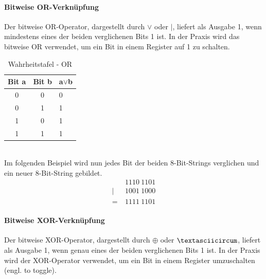 \documentclass[12pt,a4paper]{scrartcl}
\numberwithin{equation}{section}
\numberwithin{myalgctr}{section}
\numberwithin{mytheoremctr}{section}
\newcommand*\BitOr{\mathrel{|}}
\newcommand{\mpar}[1]{\paragraph*{#1}\mbox{}\par}
\begin{document}
	\mpar{Bitweise OR-Verknüpfung}\noindent
	Der bitweise OR-Operator, dargestellt durch $\vee$ oder $\BitOr$, liefert als Ausgabe 1, wenn mindestens eines der beiden verglichenen Bits 1 ist. In der Praxis wird das bitweise OR verwendet, um ein Bit in einem Register auf 1 zu schalten.\\
	\begin{table}[h!]
		\centering
		\begin{tabular}{|c|c|l|}
			\hline
			\rowcolor[HTML]{C0C0C0} 
			{\color[HTML]{000000} Bit a} & {\color[HTML]{000000} Bit b} & {\color[HTML]{000000} a$\vee$b} \\ \hline
			\rowcolor[HTML]{EFEFEF} 
			0                            & 0                            & 0                             \\ \hline
			\rowcolor[HTML]{EFEFEF} 
			0                            & 1                            & 1                             \\ \hline
			\rowcolor[HTML]{EFEFEF} 
			1                            & 0                            & 1                             \\ \hline
			\rowcolor[HTML]{EFEFEF} 
			1                            & 1                            & 1                             \\ \hline
		\end{tabular}
		\caption{Wahrheitstafel - OR}
	\end{table}\\
	Im folgenden Beispiel wird nun jedes Bit der beiden 8-Bit-Strings verglichen und ein neuer 8-Bit-String gebildet.
	\begin{align*}
	&1110~1101\\
	\BitOr~&1001~1000\\
	=~&1111~1101
	\end{align*}
	\mpar{Bitweise XOR-Verknüpfung}\noindent
	Der bitweise XOR-Operator, dargestellt durch $\oplus$ oder $\textasciicircum$, liefert als Ausgabe 1, wenn genau eines der beiden verglichenen Bits 1 ist. In der Praxis wird der XOR-Operator verwendet, um ein Bit in einem Register umzuschalten (engl. to toggle).\\
\end{document}
